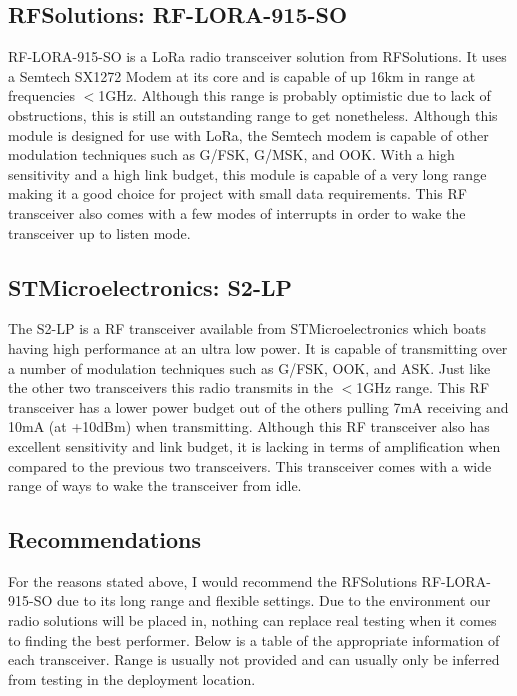 \documentclass[draftclsnofoot,onecolumn, 10pt, compsoc]{IEEEtran}
\begin{document}
	\subsection{RFSolutions: RF-LORA-915-SO}
	RF-LORA-915-SO is a LoRa radio transceiver solution from RFSolutions. It uses a Semtech SX1272 Modem at its core and is capable of up 16km in range at frequencies $<$1GHz. Although this range is probably optimistic due to lack of obstructions, this is still an outstanding range to get nonetheless. Although this module is designed for use with LoRa, the Semtech modem is capable of other modulation techniques such as G/FSK, G/MSK, and OOK. With a high sensitivity and a high link budget, this module is capable of a very long range making it a good choice for project with small data requirements. This RF transceiver also comes with a few modes of interrupts in order to wake the transceiver up to listen mode.
	
	\subsection{STMicroelectronics: S2-LP}
	The S2-LP is a RF transceiver available from STMicroelectronics which boats having high performance at an ultra low power. It is capable of transmitting over a number of modulation techniques such as G/FSK, OOK, and ASK. Just like the other two transceivers this radio transmits in the $<$1GHz range. This RF transceiver has a lower power budget out of the others pulling 7mA receiving and 10mA (at +10dBm) when transmitting. Although this RF transceiver also has excellent sensitivity and link budget, it is lacking in terms of amplification when compared to the previous two transceivers. This transceiver comes with a wide range of ways to wake the transceiver from idle.
	
	\subsection{Recommendations}
	For the reasons stated above, I would recommend the RFSolutions RF-LORA-915-SO due to its long range and flexible settings. Due to the environment our radio solutions will be placed in, nothing can replace real testing when it comes to finding the best performer. Below is a table of the appropriate information of each transceiver. Range is usually not provided and can usually only be inferred from testing in the deployment location.
	
\end{document}

